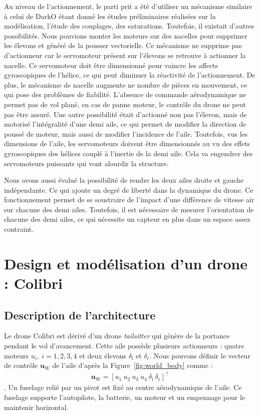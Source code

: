 {Au niveau de l'actionnement, le parti prit a été d'utiliser un mécanisme similaire à celui de DarkO étant donné les études préliminaires réalisées sur la modélisation, l'étude des couplages, des saturations. Toutefois, il existait d'autres possibilités.
Nous pouvions monter les moteurs sur des nacelles pour supprimer les élevons et généré de la pousser vectorielle. Ce mécanisme ne supprime pas d'actionneur car le servomoteur présent sur l'élevons se retrouve à actionner la nacelle. Ce servomoteur doit être dimensionné pour vaincre les affects gyroscopiques de l'hélice, ce qui peut diminuer la réactivité de l'actionnement. De plus, le mécanisme de nacelle augmente ne nombre de pièces en mouvement, ce qui pose des problèmes de fiabilité. L'absence de commande aérodynamique ne permet pas de vol plané, en cas de panne moteur, le contrôle du drone ne peut pas être assuré.
Une autre possibilité était d'actionné non pas l'élevon, mais de motorisé l'intégralité d'une demi aile, ce qui permet de modifier la direction de poussé de moteur, mais aussi de modifier l'incidence de l'aile. Toutefois, vus les dimensions de l'aile, les servomoteurs doivent être dimensionnés au vu des effets gyroscopiques des hélices couplé à l'inertie de la demi aile. Cela va engendrer des servomoteurs puissants qui vont alourdir la structure.

 Nous avons aussi évalué la possibilité de rendre les deux ailes droite et gauche indépendante. Ce qui ajoute un degré de liberté dans la dynamique du drone. Ce fonctionnement permet de se soustraire de l'impact d'une différence de vitesse air sur chacune des demi ailes. Toutefois, il est nécessaire de mesurer l'orientation de chacune des demi ailes, ce qui nécessite un capteur en plus dans un espace assez contraint.

}


\section{Design et modélisation d'un drone : Colibri}
\label{sec:model_colibri}

\subsection{Description de l'architecture}
Le drone Colibri est dérivé d'un drone \textit{tailsitter} qui génère de la portance pendant le vol d'avancement. Cette aile possède plusieurs actionneurs : quatre moteurs $u_{i}, ~i = 1,2,3,4$ et deux élevons $\delta_{\text{l}}$ et $\delta_{\text{r}}$. Nous pouvons définir le vecteur de contrôle $\boldsymbol{u}_{\text{W}}$ de l'aile d'après la Figure~\ref{fig:world_body} comme :
\begin{align}
    \label{eq:uw}
    \boldsymbol{u}_{\text{W}} = [u_{1}~u_{2}~u_{3}~u_{4}~\delta_{\text{l}}~\delta_{\text{r}}]^\top
\end{align}. Un fuselage relié par un pivot est fixé au centre aérodynamique de l'aile. Ce fuselage supporte l'autopilote, la batterie, un moteur et un empennage pour le maintenir horizontal.

